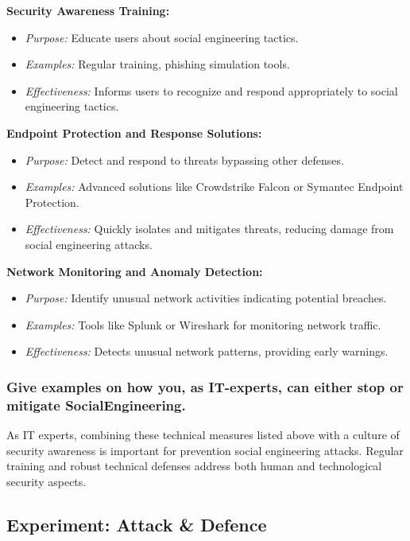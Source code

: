 \textbf{Security Awareness Training:}
\begin{itemize}
    \item \textit{Purpose:} Educate users about social engineering tactics.
    \item \textit{Examples:} Regular training, phishing simulation tools.
    \item \textit{Effectiveness:} Informs users to recognize and respond appropriately to social engineering tactics.
\end{itemize}

\textbf{Endpoint Protection and Response Solutions:}
\begin{itemize}
    \item \textit{Purpose:} Detect and respond to threats bypassing other defenses.
    \item \textit{Examples:} Advanced solutions like Crowdstrike Falcon or Symantec Endpoint Protection.
    \item \textit{Effectiveness:} Quickly isolates and mitigates threats, reducing damage from social engineering attacks.
\end{itemize}

\textbf{Network Monitoring and Anomaly Detection:}
\begin{itemize}
    \item \textit{Purpose:} Identify unusual network activities indicating potential breaches.
    \item \textit{Examples:} Tools like Splunk or Wireshark for monitoring network traffic.
    \item \textit{Effectiveness:} Detects unusual network patterns, providing early warnings.
\end{itemize}


\subsubsection{Give examples on how you, as IT-experts, can either stop or mitigate SocialEngineering.}

As IT experts, combining these technical measures listed above with a culture of security awareness is important for prevention social engineering attacks.
Regular training and robust technical defenses address both human and technological security aspects.


\subsection{Experiment: Attack \& Defence}

